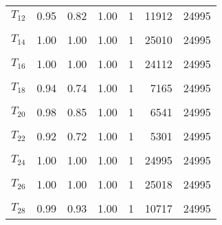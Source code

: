 \begin{longtable}[t]{lrrrrrr}
$T_{12}$ & 0.95 & 0.82 & 1.00 & 1 & 11912 & 24995\\
\cellcolor{gray!6}{$T_{13}$} & \cellcolor{gray!6}{1.00} & \cellcolor{gray!6}{1.00} & \cellcolor{gray!6}{1.00} & \cellcolor{gray!6}{1} & \cellcolor{gray!6}{22245} & \cellcolor{gray!6}{24995}\\
$T_{14}$ & 1.00 & 1.00 & 1.00 & 1 & 25010 & 24995\\
\cellcolor{gray!6}{$T_{15}$} & \cellcolor{gray!6}{0.96} & \cellcolor{gray!6}{0.81} & \cellcolor{gray!6}{1.00} & \cellcolor{gray!6}{1} & \cellcolor{gray!6}{11245} & \cellcolor{gray!6}{24995}\\
$T_{16}$ & 1.00 & 1.00 & 1.00 & 1 & 24112 & 24995\\
\cellcolor{gray!6}{$T_{17}$} & \cellcolor{gray!6}{0.98} & \cellcolor{gray!6}{0.88} & \cellcolor{gray!6}{1.00} & \cellcolor{gray!6}{1} & \cellcolor{gray!6}{12999} & \cellcolor{gray!6}{24995}\\
$T_{18}$ & 0.94 & 0.74 & 1.00 & 1 & 7165 & 24995\\
\cellcolor{gray!6}{$T_{19}$} & \cellcolor{gray!6}{1.00} & \cellcolor{gray!6}{1.00} & \cellcolor{gray!6}{1.00} & \cellcolor{gray!6}{1} & \cellcolor{gray!6}{24995} & \cellcolor{gray!6}{24995}\\
$T_{20}$ & 0.98 & 0.85 & 1.00 & 1 & 6541 & 24995\\
\cellcolor{gray!6}{$T_{21}$} & \cellcolor{gray!6}{0.91} & \cellcolor{gray!6}{0.74} & \cellcolor{gray!6}{1.00} & \cellcolor{gray!6}{1} & \cellcolor{gray!6}{8703} & \cellcolor{gray!6}{24995}\\
$T_{22}$ & 0.92 & 0.72 & 1.00 & 1 & 5301 & 24995\\
\cellcolor{gray!6}{$T_{23}$} & \cellcolor{gray!6}{0.97} & \cellcolor{gray!6}{0.82} & \cellcolor{gray!6}{1.00} & \cellcolor{gray!6}{1} & \cellcolor{gray!6}{9463} & \cellcolor{gray!6}{24995}\\
$T_{24}$ & 1.00 & 1.00 & 1.00 & 1 & 24995 & 24995\\
\cellcolor{gray!6}{$T_{25}$} & \cellcolor{gray!6}{0.97} & \cellcolor{gray!6}{0.81} & \cellcolor{gray!6}{1.00} & \cellcolor{gray!6}{1} & \cellcolor{gray!6}{8008} & \cellcolor{gray!6}{24995}\\
$T_{26}$ & 1.00 & 1.00 & 1.00 & 1 & 25018 & 24995\\
\cellcolor{gray!6}{$T_{27}$} & \cellcolor{gray!6}{0.97} & \cellcolor{gray!6}{0.84} & \cellcolor{gray!6}{1.00} & \cellcolor{gray!6}{1} & \cellcolor{gray!6}{12215} & \cellcolor{gray!6}{24995}\\
$T_{28}$ & 0.99 & 0.93 & 1.00 & 1 & 10717 & 24995\\

\end{longtable}
